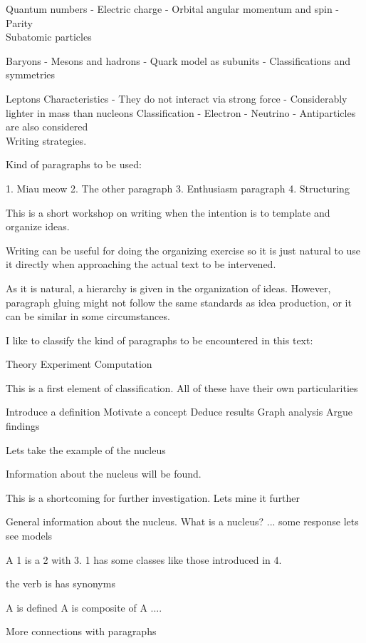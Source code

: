 \documentclass[openany]{book}
\begin{document}
Quantum numbers
-	Electric charge
-	Orbital angular momentum and spin 
-	Parity \\ 

Subatomic particles 

Baryons
-	Mesons and hadrons 
-	Quark model as subunits 
- 	Classifications and symmetries

Leptons 
Characteristics
-	They do not interact via strong force
-	Considerably lighter in mass than nucleons
Classification 
-	Electron 
-	Neutrino 
-	Antiparticles are also considered \\ 

Writing strategies.

Kind of paragraphs to be used: 

1.	Miau meow
2.	The other paragraph 
3.	Enthusiasm paragraph 
4.	Structuring

This is a short workshop on writing when the intention is to template and organize ideas. 

Writing can be useful for doing the organizing exercise so it is just natural to use it directly when approaching the actual text to be intervened. 

As it is natural, a hierarchy is given in the organization of ideas. However, paragraph gluing might not follow the same standards as idea production, or it can be similar in some circumstances. 

I like to classify the kind of paragraphs to be encountered in this text: 

Theory 
Experiment
Computation

This is a first element of classification. All of these have their own particularities 

Introduce a definition 
Motivate a concept 
Deduce results
Graph analysis 
Argue findings 

Lets take the example of the nucleus 
 
Information about the nucleus will be found. 
 
This is a shortcoming for further investigation. Lets mine it further 

General information about the nucleus. 
	What is a nucleus? ... some response lets see models 
	
	A 1 is a 2 with 3. 1 has some classes like those introduced in 4. 
	
	the verb is has synonyms
	
	A is defined
	A is composite of 
	A .... 
	
	More connections with paragraphs
	
\end{document}
